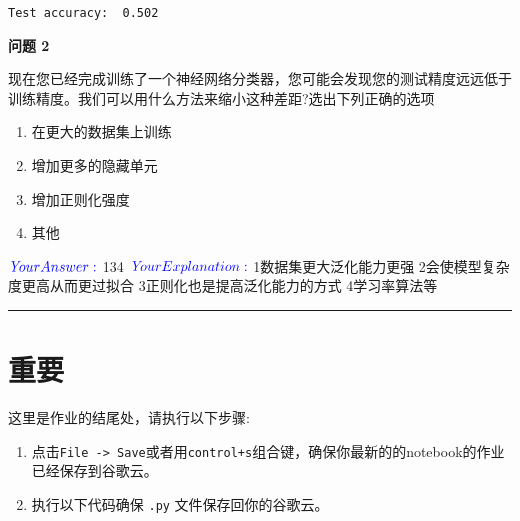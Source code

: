 \documentclass[11pt]{article}
\providecommand{\tightlist}{%
      \setlength{\itemsep}{0pt}\setlength{\parskip}{0pt}}
\begin{document}
    \begin{Verbatim}[commandchars=\\\{\}]
Test accuracy:  0.502
    \end{Verbatim}

    \textbf{问题 2}

现在您已经完成训练了一个神经网络分类器，您可能会发现您的测试精度远远低于训练精度。我们可以用什么方法来缩小这种差距?选出下列正确的选项

\begin{enumerate}
\def\labelenumi{\arabic{enumi}.}
\tightlist
\item
  在更大的数据集上训练
\item
  增加更多的隐藏单元
\item
  增加正则化强度
\item
  其他
\end{enumerate}

\(\color{blue}{\textit Your Answer:}\) 134
\(\color{blue}{\textit Your Explanation:}\) 1数据集更大泛化能力更强
2会使模型复杂度更高从而更过拟合 3正则化也是提高泛化能力的方式
4学习率算法等

    \begin{center}\rule{0.5\linewidth}{0.5pt}\end{center}

\hypertarget{ux91cdux8981}{%
\section{重要}\label{ux91cdux8981}}

这里是作业的结尾处，请执行以下步骤:

\begin{enumerate}
\def\labelenumi{\arabic{enumi}.}
\tightlist
\item
  点击\texttt{File\ -\textgreater{}\ Save}或者用\texttt{control+s}组合键，确保你最新的的notebook的作业已经保存到谷歌云。
\item
  执行以下代码确保 \texttt{.py} 文件保存回你的谷歌云。
\end{enumerate}
\end{document}
